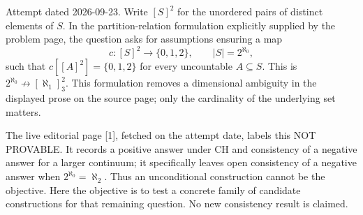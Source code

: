 Attempt dated 2026-09-23. Write $[S]^2$ for the unordered pairs of distinct elements of $S$. In the partition-relation formulation explicitly supplied by the problem page, the question asks for assumptions ensuring a map
\[
c:[S]^2\longrightarrow\{0,1,2\},\qquad |S|=2^{\aleph_0},
\]
such that $c[[A]^2]=\{0,1,2\}$ for every uncountable $A\subseteq S$. This is $2^{\aleph_0}\not\to[\aleph_1]^2_3$. This formulation removes a dimensional ambiguity in the displayed prose on the source page; only the cardinality of the underlying set matters.

The live editorial page [1], fetched on the attempt date, labels this NOT PROVABLE. It records a positive answer under CH and consistency of a negative answer for a larger continuum; it specifically leaves open consistency of a negative answer when $2^{\aleph_0}=\aleph_2$. Thus an unconditional construction cannot be the objective. Here the objective is to test a concrete family of candidate constructions for that remaining question. No new consistency result is claimed.
